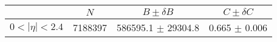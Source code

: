 \begin{tabular}{lccc}
\hline
    &   $N$   & $B \pm \delta B$  &  $C \pm \delta C$ \\
\hline
$0 < |\eta| <2.4$              & 7188397    & 586595.1   $\pm$ 29304.8 & 0.665      $\pm$ 0.006 \\
\hline
\end{tabular}
